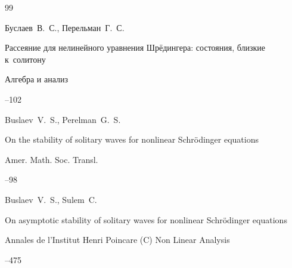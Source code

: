 \begin{thebibliography}{99}




\by Буслаев~В.~С., Перельман~Г.~С.

\paper Рассеяние для нелинейного уравнения Шрёдингера: состояния, близкие к~солитону

\jour Алгебра и анализ




--102













\by Buslaev~V.~S., Perelman~G.~S. 

\paper On the stability of solitary waves for nonlinear Schrödinger equations



\jour Amer. Math. Soc. Transl.



--98





\by Buslaev~V.~S., Sulem~C.

\paper On asymptotic stability of solitary waves for nonlinear Schrödinger equations

\jour Annales de l'Institut Henri Poincare (C) Non Linear Analysis




--475


\end{thebibliography}
